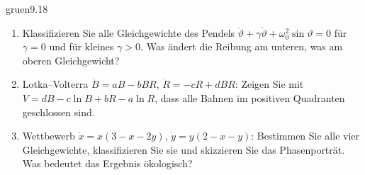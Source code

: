 \begin{karte}{gruen}{9.18}{\typwerk}{}
\begin{enumerate}[label=(\alph*),leftmargin=1.6em,itemsep=2pt]
\item Klassifizieren Sie alle Gleichgewichte des Pendels $\ddot\vartheta + \gamma\dot\vartheta + \omega_0^{2}\sin\vartheta = 0$ für $\gamma = 0$ und für kleines $\gamma > 0$. Was ändert die Reibung am unteren, was am oberen Gleichgewicht?
\item Lotka--Volterra $\dot B = aB - bBR$, $\dot R = -cR + dBR$: Zeigen Sie mit $V = dB - c\ln B + bR - a\ln R$, dass alle Bahnen im positiven Quadranten geschlossen sind.
\item Wettbewerb $\dot x = x(3 - x - 2y)$, $\dot y = y(2 - x - y)$: Bestimmen Sie alle vier Gleichgewichte, klassifizieren Sie sie und skizzieren Sie das Phasenporträt. Was bedeutet das Ergebnis ökologisch?
\end{enumerate}
\end{karte}

